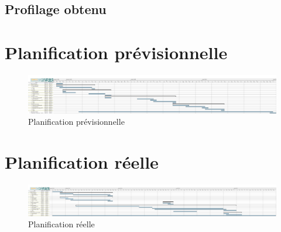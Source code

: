 \documentclass{report}
\begin{document}
\section{Profilage obtenu}








\nocite{*}


\appendix
\chapter{Planification prévisionnelle}
	\begin{figure}
		 \hspace{-4cm} 
			\includegraphics[scale=0.4]{../DiagrammePrevisionnel.png}
			\caption[Planification prévisionnelle]{Planification prévisionnelle}
	\end{figure}
	\medskip
		
\chapter{Planification réelle}
	\begin{figure}
		 \hspace{-4cm} 
			\includegraphics[scale=0.4]{../DiagrammeReel.png}
			\caption[Planification réelle]{Planification réelle}
	\end{figure}
	\medskip
		
		
		
\end{document}
